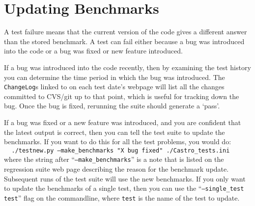 \section{Updating Benchmarks}

A test failure means that the current version of the code gives a
different answer than the stored benchmark.  A test can fail either
because a bug was introduced into the code or a bug was fixed or new
feature introduced.

If a bug was introduced into the code recently, then by examining the
test history you can determine the time period in which the bug was
introduced.  The {\tt ChangeLog}s linked to on each test date's webpage
will list all the changes committed to CVS/git up to that point, which is
useful for tracking down the bug.  Once the bug is fixed, rerunning
the suite should generate a `pass'.

If a bug was fixed or a new feature was introduced, and you are
confident that the latest output is correct, then you can tell the
test suite to update the benchmarks.  If you want to do this for all
the test problems, you would do:\\
$~~~~~${\tt ./testnew.py --make\_benchmarks "X bug fixed" ./Castro\_tests.ini} \\
where the string after ``{\tt --make\_benchmarks}'' is a note that is listed
on the regression suite web page describing the reason for the benchmark
update.  Subsequent runs of the test suite will use the new benchmarks.
If you only want to update the benchmarks of a single test, then you
can use the ``{\tt --single\_test test}'' flag on the commandline, where
{\tt test} is the name of the test to update.

